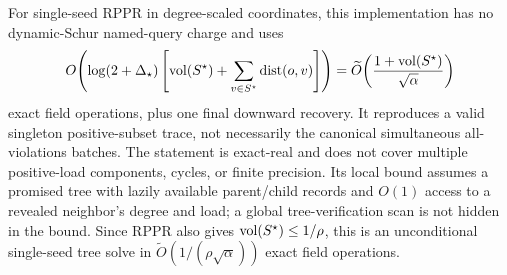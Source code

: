 \begin{theorem}
For single-seed RPPR in degree-scaled coordinates, this implementation has
no dynamic-Schur named-query charge and uses
\begin{equation}
 O\!\left(
  \log(2+\Delta_\star)\left[
   \operatorname{vol}(S^\star)+
   \sum_{v\in S^\star}\operatorname{dist}(o,v)
  \right]
 \right)
 =\widetilde O\!\left(
  \frac{1+\operatorname{vol}(S^\star)}{\sqrt\alpha}
 \right)
 \label{eq:aesp-cd-tree-threshold-work}
\end{equation}
exact field operations, plus one final downward recovery.  It reproduces a
valid singleton positive-subset trace, not necessarily the canonical
simultaneous all-violations batches.  The statement is exact-real and does
not cover multiple positive-load components, cycles, or finite precision.
Its local bound assumes a promised tree with lazily available parent/child
records and $O(1)$ access to a revealed neighbor's degree and load; a global
tree-verification scan is not hidden in the bound.
Since RPPR also gives $\operatorname{vol}(S^\star)\leq1/\rho$, this is an unconditional
single-seed tree solve in
$\widetilde O(1/(\rho\sqrt\alpha))$ exact field operations.
\end{theorem}

